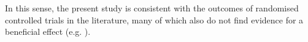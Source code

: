 In this sense, the present study is consistent with the outcomes
of randomised controlled trials in the literature, many of which also do not find evidence for a beneficial effect
(e.g. ).


